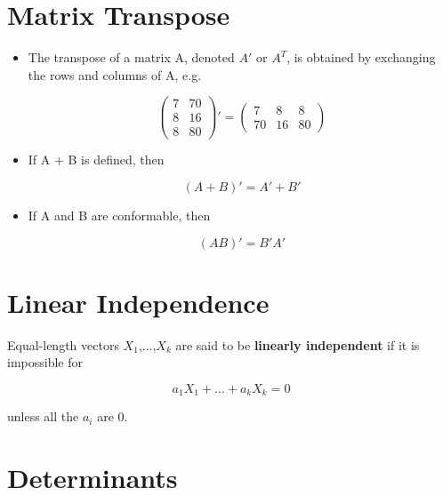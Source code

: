 \section{Matrix Transpose}

\begin{itemize}

\item The transpose of a matrix A, denoted $A'$ or $A^{T}$, is obtained by
exchanging the rows and columns of A, e.g.

\begin{equation}
\left (
\begin{array}{cc}
7 & 70 \\
8 & 16 \\
8 & 80
\end{array}
\right )' =
\left (
\begin{array}{ccc}
7 & 8 & 8 \\
70 & 16 & 80
\end{array}
\right )
\end{equation}

\item If A + B is defined, then

\begin{equation}
(A+B)' = A' + B'
\end{equation}

\item If A and B are conformable, then

\begin{equation}
(AB)' = B'A'
\end{equation}

\end{itemize}

\section{Linear Independence}

Equal-length vectors $X_1$,...,$X_k$ are said to be {\bf linearly
independent} if it is impossible for

\begin{equation}
a_1 X_1 +
... +
a_k X_k = 0
\end{equation}

unless all the $a_i$ are 0.

\section{Determinants}

